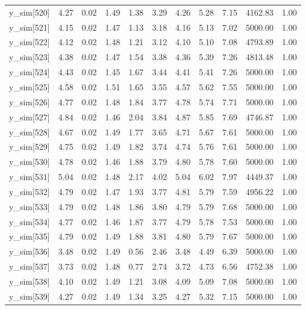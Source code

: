 \begin{table}[ht]
\begin{tabular}{rrrrrrrrrrr}
  y\_sim[520] & 4.27 & 0.02 & 1.49 & 1.38 & 3.29 & 4.26 & 5.28 & 7.15 & 4162.83 & 1.00 \\ 
  y\_sim[521] & 4.15 & 0.02 & 1.47 & 1.13 & 3.18 & 4.16 & 5.13 & 7.02 & 5000.00 & 1.00 \\ 
  y\_sim[522] & 4.12 & 0.02 & 1.48 & 1.21 & 3.12 & 4.10 & 5.10 & 7.08 & 4793.89 & 1.00 \\ 
  y\_sim[523] & 4.38 & 0.02 & 1.47 & 1.54 & 3.38 & 4.36 & 5.39 & 7.26 & 4813.48 & 1.00 \\ 
  y\_sim[524] & 4.43 & 0.02 & 1.45 & 1.67 & 3.44 & 4.41 & 5.41 & 7.26 & 5000.00 & 1.00 \\ 
  y\_sim[525] & 4.58 & 0.02 & 1.51 & 1.65 & 3.55 & 4.57 & 5.62 & 7.55 & 5000.00 & 1.00 \\ 
  y\_sim[526] & 4.77 & 0.02 & 1.48 & 1.84 & 3.77 & 4.78 & 5.74 & 7.71 & 5000.00 & 1.00 \\ 
  y\_sim[527] & 4.84 & 0.02 & 1.46 & 2.04 & 3.84 & 4.87 & 5.85 & 7.69 & 4746.87 & 1.00 \\ 
  y\_sim[528] & 4.67 & 0.02 & 1.49 & 1.77 & 3.65 & 4.71 & 5.67 & 7.61 & 5000.00 & 1.00 \\ 
  y\_sim[529] & 4.75 & 0.02 & 1.49 & 1.82 & 3.74 & 4.74 & 5.76 & 7.61 & 5000.00 & 1.00 \\ 
  y\_sim[530] & 4.78 & 0.02 & 1.46 & 1.88 & 3.79 & 4.80 & 5.78 & 7.60 & 5000.00 & 1.00 \\ 
  y\_sim[531] & 5.04 & 0.02 & 1.48 & 2.17 & 4.02 & 5.04 & 6.02 & 7.97 & 4449.37 & 1.00 \\ 
  y\_sim[532] & 4.79 & 0.02 & 1.47 & 1.93 & 3.77 & 4.81 & 5.79 & 7.59 & 4956.22 & 1.00 \\ 
  y\_sim[533] & 4.79 & 0.02 & 1.48 & 1.86 & 3.80 & 4.79 & 5.79 & 7.68 & 5000.00 & 1.00 \\ 
  y\_sim[534] & 4.77 & 0.02 & 1.46 & 1.87 & 3.77 & 4.79 & 5.78 & 7.53 & 5000.00 & 1.00 \\ 
  y\_sim[535] & 4.79 & 0.02 & 1.49 & 1.88 & 3.81 & 4.80 & 5.79 & 7.67 & 5000.00 & 1.00 \\ 
  y\_sim[536] & 3.48 & 0.02 & 1.49 & 0.56 & 2.46 & 3.48 & 4.49 & 6.39 & 5000.00 & 1.00 \\ 
  y\_sim[537] & 3.73 & 0.02 & 1.48 & 0.77 & 2.74 & 3.72 & 4.73 & 6.56 & 4752.38 & 1.00 \\ 
  y\_sim[538] & 4.10 & 0.02 & 1.49 & 1.21 & 3.08 & 4.09 & 5.09 & 7.08 & 5000.00 & 1.00 \\ 
  y\_sim[539] & 4.27 & 0.02 & 1.49 & 1.34 & 3.25 & 4.27 & 5.32 & 7.15 & 5000.00 & 1.00 \\ 

\end{tabular}
\end{table}
